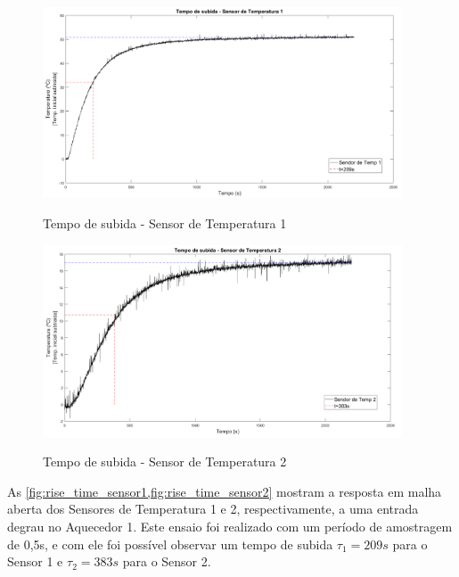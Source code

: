 \begin{figure}[h]
	\caption{Tempo de subida - Sensor de Temperatura 1}
	\begin{center}
		\includegraphics[width=0.95\textwidth]{./5_images/RiseTime-TempSensor1.png} 
		\label{fig:rise_time_sensor1}
	\end{center}
	\centering
\end{figure}

\begin{figure}[h]
	\caption{Tempo de subida - Sensor de Temperatura 2}
	\begin{center}
		\includegraphics[width=0.95\textwidth]{./5_images/RiseTime-TempSensor2.png} 
		\label{fig:rise_time_sensor2}
	\end{center}
	\centering
\end{figure}

As \cref{fig:rise_time_sensor1,fig:rise_time_sensor2} mostram a resposta em malha aberta dos Sensores de
Temperatura 1 e 2, respectivamente, a uma entrada degrau no Aquecedor 1. Este ensaio foi realizado com
um período de amostragem de 0,5s, e com ele foi possível observar um tempo de subida $\tau_1 = 209s$ para
o Sensor 1 e $\tau_2 = 383s$ para o Sensor 2.

